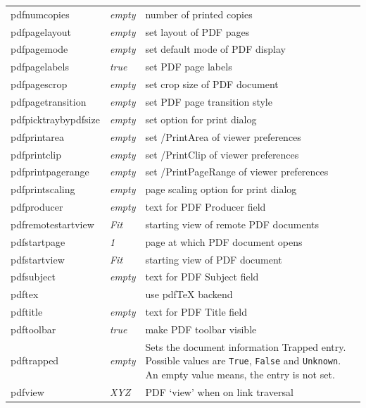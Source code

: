 \documentclass[pdftex]{article}
\begin{document}
\begin{longtable}{@{}>{\ttfamily}llp{7cm}@{}}
pdfnumcopies       & \textit{empty}         & number of printed copies\\
pdfpagelayout      & \textit{empty}         & set layout of PDF pages \\
pdfpagemode        & \textit{empty}         & set default mode of PDF display \\
pdfpagelabels      & \textit{true}          & set PDF page labels \\
pdfpagescrop       & \textit{empty}         & set crop size of PDF document \\
pdfpagetransition  & \textit{empty}         & set PDF page transition style \\
pdfpicktraybypdfsize
                   & \textit{empty}         & set option for print dialog \\
pdfprintarea       & \textit{empty}         & set /PrintArea of viewer preferences \\
pdfprintclip       & \textit{empty}         & set /PrintClip of viewer preferences \\
pdfprintpagerange  & \textit{empty}         & set /PrintPageRange of viewer preferences \\
pdfprintscaling    & \textit{empty}         & page scaling option for print dialog \\
pdfproducer        & \textit{empty}         & text for PDF Producer field \\
pdfremotestartview & \textit{Fit}           & starting view of remote PDF documents \\
pdfstartpage       & \textit{1}             & page at which PDF document opens \\
pdfstartview       & \textit{Fit}           & starting view of PDF document \\
pdfsubject         & \textit{empty}         & text for PDF Subject field \\
pdftex             &                        & use \textsf{pdf\TeX} backend \\
pdftitle           & \textit{empty}         & text for PDF Title field \\
pdftoolbar         & \textit{true}          & make PDF toolbar visible \\
pdftrapped         & \textit{empty} & Sets the document information Trapped entry.
  Possible values are \texttt{True}, \texttt{False} and \texttt{Unknown}.
  An empty value means, the entry is not set.\\
pdfview            & \textit{XYZ}           & PDF `view' when on link traversal \\

\end{longtable}
\end{document}
